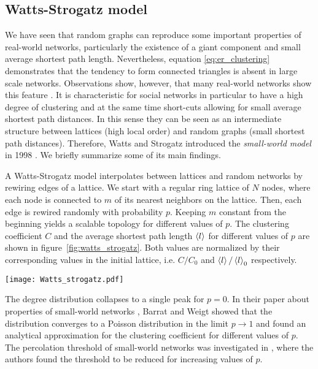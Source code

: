 \subsection{Watts-Strogatz model}\label{sec:watts_strogatz_model}
We have seen that random graphs can reproduce some important properties of real-world networks, particularly the existence of a giant component and small average shortest path length.
Nevertheless, equation \eqref{eq:er_clustering} demonstrates that the tendency to form connected triangles is absent in large scale \ER networks.
Observations show, however, that many real-world networks show this feature \citep{WassermanFaust,Newman2003,Milgram:1967}.
It is characteristic for social networks in particular to have a high degree of clustering and at the same time short-cuts allowing for small average shortest path distances.
In this sense they can be seen as an intermediate structure between lattices (high local order) and random graphs (small shortest path distances).
Therefore, Watts and Strogatz introduced the \emph{small-world model} in 1998 \citep{Watts:1998}.
We briefly summarize some of its main findings.

A Watts-Strogatz model interpolates between lattices and random networks by rewiring edges of a lattice.
We start with a regular ring lattice of $N$ nodes, where each node is connected to $m$ of its nearest neighbors on the lattice.
Then, each edge is rewired randomly with probability $p$.
Keeping $m$ constant from the beginning yields a scalable topology for different values of $p$.
The clustering coefficient $C$ and the average shortest path length $\left< l \right>$ for different values of $p$ are shown in figure~\ref{fig:watts_strogatz}.
Both values are normalized by their corresponding values in the initial lattice, i.e. $C/C_0$ and $\left< l \right>/\left< l \right>_0$ respectively.
%
\begin{SCfigure}
\texttt{[image: Watts\_strogatz.pdf]}
\caption{Clustering coefficient and average shortest path length in the Watts-Strogatz model.
Both quantities are  normalized to the the corresponding value for $p=0$.
Results for networks with $N=1000$ nodes and $m=10$.
Every data point is the average of 1000 realizations.}
\label{fig:watts_strogatz}
\end{SCfigure}

The degree distribution collapses to a single peak for $p=0$.
In their paper about properties of small-world networks \citep{Barrat:2000fj}, Barrat and Weigt showed that the distribution converges to a Poisson distribution in the limit $p\rightarrow 1$ and found an analytical approximation for the clustering coefficient for different values of $p$.
The percolation threshold of small-world networks was investigated in \citep{Sander2002293}, where the authors found the threshold to be reduced for increasing values of $p$.

